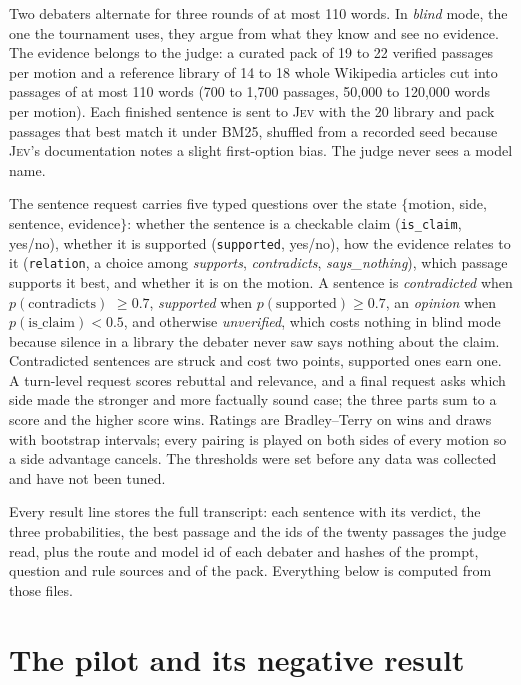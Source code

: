 \documentclass[11pt,a4paper]{article}
\newcommand{\jev}{\textsc{Jev}}
\newcommand{\pc}{$p(\text{contradicts})$}
\begin{document}
Two debaters alternate for three rounds of at most 110 words. In \emph{blind} mode, the one the tournament uses, they argue from what they know and see no evidence. The evidence belongs to the judge: a curated pack of 19 to 22 verified passages per motion and a reference library of 14 to 18 whole Wikipedia articles cut into passages of at most 110 words (700 to 1,700 passages, 50,000 to 120,000 words per motion). Each finished sentence is sent to \jev{} with the 20 library and pack passages that best match it under BM25, shuffled from a recorded seed because \jev{}'s documentation notes a slight first-option bias. The judge never sees a model name.

The sentence request carries five typed questions over the state $\{$motion, side, sentence, evidence$\}$: whether the sentence is a checkable claim (\texttt{is\_claim}, yes/no), whether it is supported (\texttt{supported}, yes/no), how the evidence relates to it (\texttt{relation}, a choice among \emph{supports}, \emph{contradicts}, \emph{says\_nothing}), which passage supports it best, and whether it is on the motion. A sentence is \emph{contradicted} when \pc{} $\ge 0.7$, \emph{supported} when $p(\text{supported}) \ge 0.7$, an \emph{opinion} when $p(\text{is\_claim}) < 0.5$, and otherwise \emph{unverified}, which costs nothing in blind mode because silence in a library the debater never saw says nothing about the claim. Contradicted sentences are struck and cost two points, supported ones earn one. A turn-level request scores rebuttal and relevance, and a final request asks which side made the stronger and more factually sound case; the three parts sum to a score and the higher score wins. Ratings are Bradley--Terry \citep{bradley1952rank} on wins and draws with bootstrap intervals; every pairing is played on both sides of every motion so a side advantage cancels. The thresholds were set before any data was collected and have not been tuned.

Every result line stores the full transcript: each sentence with its verdict, the three probabilities, the best passage and the ids of the twenty passages the judge read, plus the route and model id of each debater and hashes of the prompt, question and rule sources and of the pack. Everything below is computed from those files.

\section{The pilot and its negative result}
\label{sec:pilot}
\end{document}
